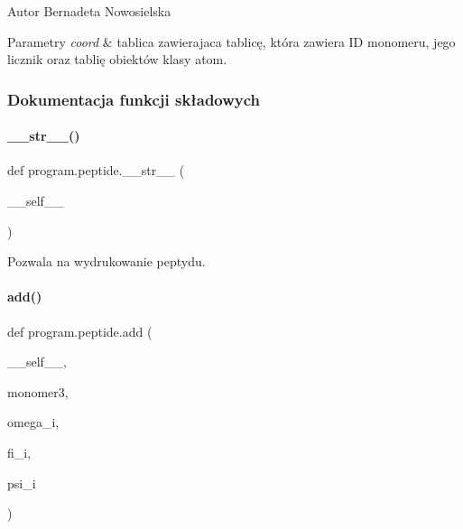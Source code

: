 \begin{DoxyAuthor}{Autor}
Bernadeta Nowosielska 
\end{DoxyAuthor}

\begin{DoxyParams}{Parametry}
{\em coord} & tablica zawierajaca tablicę, która zawiera ID monomeru, jego licznik oraz tablię obiektów klasy atom. \\
\hline
\end{DoxyParams}


\subsubsection{Dokumentacja funkcji składowych}
\mbox{\label{classprogram_1_1peptide_a837884fbb3509dc1e7b165b7aefedf9f}} 
\paragraph{\+\_\+\+\_\+str\+\_\+\+\_\+()}
{\footnotesize\ttfamily def program.\+peptide.\+\_\+\+\_\+str\+\_\+\+\_\+ (\begin{DoxyParamCaption}\item[{}]{\+\_\+\+\_\+self\+\_\+\+\_\+ }\end{DoxyParamCaption})}



Pozwala na wydrukowanie peptydu. 

\mbox{\label{classprogram_1_1peptide_a87723a307c97c4f8cb3bf96bfad8c345}} 
\paragraph{add()}
{\footnotesize\ttfamily def program.\+peptide.\+add (\begin{DoxyParamCaption}\item[{}]{\+\_\+\+\_\+self\+\_\+\+\_\+,  }\item[{}]{monomer3,  }\item[{}]{omega\+\_\+i,  }\item[{}]{fi\+\_\+i,  }\item[{}]{psi\+\_\+i }\end{DoxyParamCaption})}



